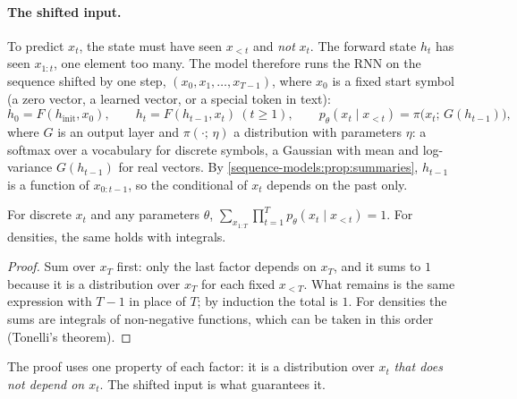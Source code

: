 \begin{notechapter}
\paragraph{The shifted input.} To predict $x_t$, the state must have seen $x_{<t}$ and \emph{not} $x_t$. The
forward state $h_t$ has seen $x_{1:t}$, one element too many. The model therefore runs the RNN on the
sequence shifted by one step, $(x_0, x_1,\dots,x_{T-1})$, where $x_0$ is a fixed start symbol (a zero vector,
a learned vector, or a special token in text):
\[
  h_0 = F(h_{\mathrm{init}}, x_0),\qquad h_t = F(h_{t-1}, x_t)\ (t\geq1),\qquad
  p_\theta(x_t\mid x_{<t}) = \pi\bigl(x_t;\,G(h_{t-1})\bigr),
\]
where $G$ is an output layer and $\pi(\cdot;\,\eta)$ a distribution with parameters $\eta$: a softmax over a vocabulary for
discrete symbols, a Gaussian with mean and log-variance $G(h_{t-1})$ for real vectors. By
\cref{sequence-models:prop:summaries}, $h_{t-1}$ is a function of $x_{0:t-1}$, so the conditional of $x_t$ depends on the past only.

\begin{proposition}\label{sequence-models:prop:normalized}
For discrete $x_t$ and any parameters $\theta$, $\sum_{x_{1:T}}\prod_{t=1}^Tp_\theta(x_t\mid x_{<t}) = 1$. For densities, the same holds with
integrals.
\end{proposition}

\begin{proof}
Sum over $x_T$ first: only the last factor depends on $x_T$, and it sums to $1$ because it is a
distribution over $x_T$ for each fixed $x_{<T}$. What remains is the same expression with $T - 1$ in place
of $T$; by induction the total is $1$. For densities the sums are integrals of non-negative
functions, which can be taken in this order (Tonelli's theorem).
\end{proof}

The proof uses one property of each factor: it is a distribution over $x_t$ \emph{that does not depend on
$x_t$}. The shifted input is what guarantees it.


\end{notechapter}
